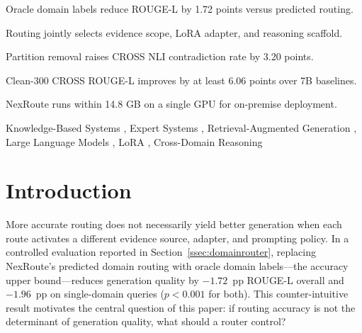 \documentclass[a4paper,fleql,doubleblind]{cas-sc}
\begin{document}
\begin{abstract}
A blinded LLM judge evaluation on 25 stratified query pairs reveals a divergence between embedding-based and task-level assessment for LAW outputs: BERTScore 88.01 coexists with judge-rated task adequacy of 1.6 (vs.\ 3.8 for Naive RAG), demonstrating that format degeneration can evade automatic metrics while substantially degrading task performance (Section~\ref{ssec:llm_judge}).
These results reposition routing as the control of downstream knowledge and reasoning resources rather than an accuracy objective in isolation, and NexRoute operates within a 14.8~GB single-GPU deployment envelope.
\end{abstract}

\begin{highlights}
    \item Oracle domain labels reduce ROUGE-L by 1.72 points versus predicted routing.
    \item Routing jointly selects evidence scope, LoRA adapter, and reasoning scaffold.
    \item Partition removal raises CROSS NLI contradiction rate by 3.20 points.
    \item Clean-300 CROSS ROUGE-L improves by at least 6.06 points over 7B baselines.
    \item NexRoute runs within 14.8 GB on a single GPU for on-premise deployment.
\end{highlights}
\begin{keywords}
Knowledge-Based Systems \sep
Expert Systems \sep
Retrieval-Augmented Generation \sep
Large Language Models \sep
LoRA \sep
Cross-Domain Reasoning
\end{keywords}
\maketitle
\section{Introduction}
\label{sec:introduction}

More accurate routing does not necessarily yield better generation when each route activates a different evidence source, adapter, and prompting policy.
In a controlled evaluation reported in Section~\ref{ssec:domainrouter}, replacing NexRoute's predicted domain routing with oracle domain labels---the accuracy upper bound---reduces generation quality by $-1.72$~pp ROUGE-L overall and $-1.96$~pp on single-domain queries ($p{<}0.001$ for both).
This counter-intuitive result motivates the central question of this paper: if routing accuracy is not the determinant of generation quality, what should a router control?
\end{document}
